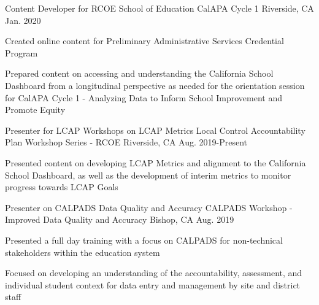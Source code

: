 

\begin{cventries}

  \cventry
    {Content Developer for RCOE School of Education} %
    {CalAPA Cycle 1} %
    {Riverside, CA} %
    {Jan. 2020} %
    {
      \begin{cvitems} %
        \item {Created online content for Preliminary Administrative Services Credential Program}
        \item {Prepared content on accessing and understanding the California School Dashboard from a longitudinal perspective as needed for the orientation session for CalAPA Cycle 1 - Analyzing Data to Inform School Improvement and Promote Equity }
      \end{cvitems}
    }

  \cventry
    {Presenter for LCAP Workshops on LCAP Metrics} %
    {Local Control Accountability Plan Workshop Series - RCOE} %
    {Riverside, CA} %
    {Aug. 2019-Present} %
    {
      \begin{cvitems} %
        \item {Presented content on developing LCAP Metrics and alignment to the California School Dashboard, as well as the development of interim metrics to monitor progress towards LCAP Goals}
      \end{cvitems}
    }

  \cventry
    {Presenter on CALPADS Data Quality and Accuracy} %
    {CALPADS Workshop - Improved Data Quality and Accuracy} %
    {Bishop, CA} %
    {Aug. 2019} %
    {
      \begin{cvitems} %
        \item {Presented a full day training with a focus on CALPADS for non-technical stakeholders within the education system}
        \item {Focused on developing an understanding of the accountability, assessment, and individual student context for data entry and management by site and district staff}
      \end{cvitems}
    }


\end{cventries}
